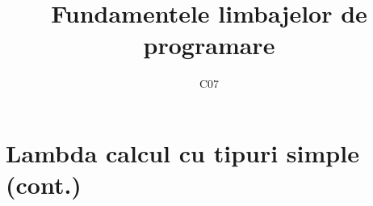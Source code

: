 \documentclass[xcolor=pdftex,romanian,colorlinks]{beamer}
\title[FLP]{Fundamentele limbajelor de programare}
\subtitle{C07}
\date{}
\begin{document}
\begin{frame}
  \titlepage
\end{frame}

\setlength{\leftmargini}{12pt}


\section{\color{section-color} Lambda calcul cu tipuri simple (cont.)}

%
%
%
%
%
%
\end{document}
